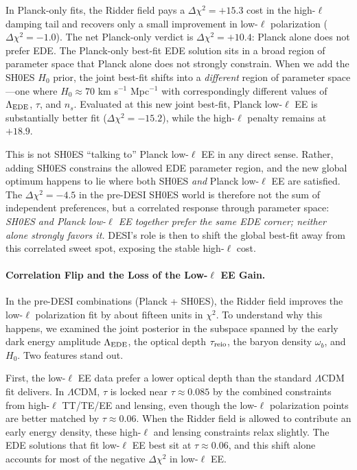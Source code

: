 \documentclass[a4paper,11pt]{article}
\begin{document}
In Planck-only fits, the Ridder field pays a $\Delta\chi^2 = +15.3$ cost in the high-$\ell$ damping tail and recovers only a small improvement in low-$\ell$ polarization ($\Delta\chi^2 = -1.0$). The net Planck-only verdict is $\Delta\chi^2 = +10.4$: Planck alone does not prefer EDE. The Planck-only best-fit EDE solution sits in a broad region of parameter space that Planck alone does not strongly constrain. When we add the SH0ES $H_0$ prior, the joint best-fit shifts into a \emph{different} region of parameter space---one where $H_0 \approx 70$ km s$^{-1}$ Mpc$^{-1}$ with correspondingly different values of $\Lambda_{\rm EDE}$, $\tau$, and $n_s$. Evaluated at this new joint best-fit, Planck low-$\ell$ EE is substantially better fit ($\Delta\chi^2 = -15.2$), while the high-$\ell$ penalty remains at $+18.9$.

This is not SH0ES ``talking to'' Planck low-$\ell$ EE in any direct sense. Rather, adding SH0ES constrains the allowed EDE parameter region, and the new global optimum happens to lie where both SH0ES \emph{and} Planck low-$\ell$ EE are satisfied. The $\Delta\chi^2 = -4.5$ in the pre-DESI SH0ES world is therefore not the sum of independent preferences, but a correlated response through parameter space: \emph{SH0ES and Planck low-$\ell$ EE together prefer the same EDE corner; neither alone strongly favors it.} DESI's role is then to shift the global best-fit away from this correlated sweet spot, exposing the stable high-$\ell$ cost.

\paragraph{Correlation Flip and the Loss of the Low-$\ell$ EE Gain.}
In the pre-DESI combinations (Planck + SH0ES), the Ridder field improves the low-$\ell$ polarization fit by about fifteen units in $\chi^2$. To understand why this happens, we examined the joint posterior in the subspace spanned by the early dark energy amplitude $\Lambda_{\rm EDE}$, the optical depth $\tau_{\rm reio}$, the baryon density $\omega_b$, and $H_0$. Two features stand out.

First, the low-$\ell$ EE data prefer a lower optical depth than the standard $\Lambda$CDM fit delivers. In $\Lambda$CDM, $\tau$ is locked near $\tau \approx 0.085$ by the combined constraints from high-$\ell$ TT/TE/EE and lensing, even though the low-$\ell$ polarization points are better matched by $\tau \approx 0.06$. When the Ridder field is allowed to contribute an early energy density, these high-$\ell$ and lensing constraints relax slightly. The EDE solutions that fit low-$\ell$ EE best sit at $\tau \approx 0.06$, and this shift alone accounts for most of the negative $\Delta\chi^2$ in low-$\ell$ EE.
\end{document}
